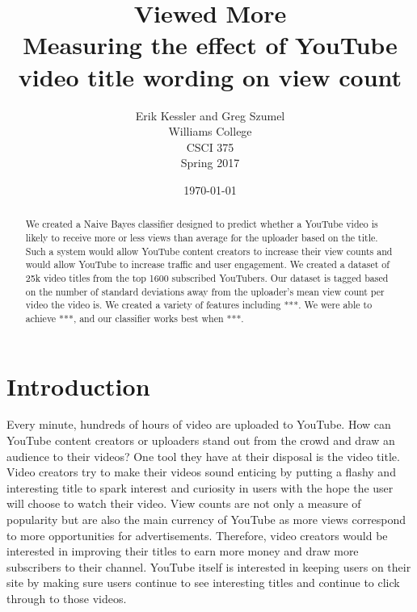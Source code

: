 \documentclass[a4paper,12pt]{article}
\begin{document}
\thispagestyle{plain}
\pagestyle{fancy}
\clearpage
\setlength{\headsep}{0.4in}

\title{Viewed More\\ \large Measuring the effect of YouTube video title wording on view count}
\date{\today}
\author{
  {\rm Erik Kessler and Greg Szumel}\\
  Williams College\\
  CSCI 375 \\
  Spring 2017
}

\maketitle

\cfoot{\thepage}

\begin{abstract}
We created a Naive Bayes classifier designed to predict whether a YouTube video is likely to receive more or less views than average for the uploader based on the title. Such a system would allow YouTube content creators to increase their view counts and would allow YouTube to increase traffic and user engagement. We created a dataset of 25k video titles from the top 1600 subscribed YouTubers. Our dataset is tagged based on the number of standard deviations away from the uploader's mean view count per video the video is. We created a variety of features including ***. We were able to achieve ***, and our classifier works best when ***. 
\end{abstract}


\section{Introduction}
Every minute, hundreds of hours of video are uploaded to YouTube. How can YouTube content creators or uploaders stand out from the crowd and draw an audience to their videos? One tool they have at their disposal is the video title. Video creators try to make their videos sound enticing by putting a flashy and interesting title to spark interest and curiosity in users with the hope the user will choose to watch their video. View counts are not only a measure of popularity but are also the main currency of YouTube as more views correspond to more opportunities for advertisements. Therefore, video creators would be interested in improving their titles to earn more money and draw more subscribers to their channel. YouTube itself is interested in keeping users on their site by making sure users continue to see interesting titles and continue to click through to those videos.
\end{document}
